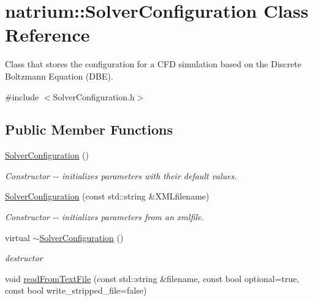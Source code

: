 \hypertarget{classnatrium_1_1SolverConfiguration}{
\section{natrium::SolverConfiguration Class Reference}
\label{classnatrium_1_1SolverConfiguration}
}


Class that stores the configuration for a CFD simulation based on the Discrete Boltzmann Equation (DBE).  


{\ttfamily \#include $<$SolverConfiguration.h$>$}\subsection*{Public Member Functions}
\begin{DoxyCompactItemize}
\item 
\hypertarget{classnatrium_1_1SolverConfiguration_a9aa7109e2eac9b8a7b424a35509ccdb0}{
\hyperlink{classnatrium_1_1SolverConfiguration_a9aa7109e2eac9b8a7b424a35509ccdb0}{SolverConfiguration} ()}
\label{classnatrium_1_1SolverConfiguration_a9aa7109e2eac9b8a7b424a35509ccdb0}

\begin{DoxyCompactList}\small\item\em Constructor -\/-\/ initializes parameters with their default values. \item\end{DoxyCompactList}\item 
\hyperlink{classnatrium_1_1SolverConfiguration_a062fa86eca607f830540ef4f2c06f0b3}{SolverConfiguration} (const std::string \&XMLfilename)
\begin{DoxyCompactList}\small\item\em Constructor -\/-\/ initializes parameters from an xmlfile. \item\end{DoxyCompactList}\item 
\hypertarget{classnatrium_1_1SolverConfiguration_ac1b521d8c205b8774dbb7c038304336d}{
virtual \hyperlink{classnatrium_1_1SolverConfiguration_ac1b521d8c205b8774dbb7c038304336d}{$\sim$SolverConfiguration} ()}
\label{classnatrium_1_1SolverConfiguration_ac1b521d8c205b8774dbb7c038304336d}

\begin{DoxyCompactList}\small\item\em destructor \item\end{DoxyCompactList}\item 
\hypertarget{classnatrium_1_1SolverConfiguration_a03f1592b0ef8c53729c5bbb9b17e5eb4}{
void \hyperlink{classnatrium_1_1SolverConfiguration_a03f1592b0ef8c53729c5bbb9b17e5eb4}{readFromTextFile} (const std::string \&filename, const bool optional=true, const bool write\_\-stripped\_\-file=false)}
\label{classnatrium_1_1SolverConfiguration_a03f1592b0ef8c53729c5bbb9b17e5eb4}


\end{DoxyCompactItemize}

